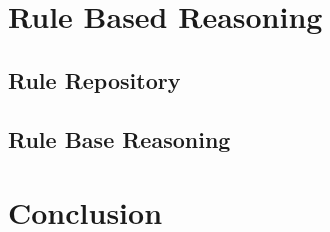 \section{Rule Based Reasoning}

\subsection{Rule Repository}

\subsection{Rule Base Reasoning}

\section{Conclusion}